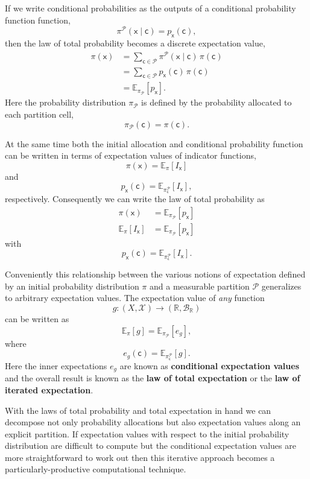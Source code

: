 \documentclass[
  letterpaper,
  DIV=11,
  numbers=noendperiod]{scrartcl}
\begin{document}
If we write conditional probabilities as the outputs of a conditional
probability function function, \[
\pi^{\mathcal{P}}( \mathsf{x} \mid \mathsf{c} )
=
p_{\mathsf{x}}( \mathsf{c} ),
\] then the law of total probability becomes a discrete expectation
value, \begin{align*}
\pi( \mathsf{x} )
&=
\sum_{ \mathsf{c} \in \mathcal{P} }
\pi^{\mathcal{P}}( \mathsf{x} \mid \mathsf{c} ) \, \pi( \mathsf{c} )
\\
&=
\sum_{ \mathsf{c} \in \mathcal{P} }
p_{\mathsf{x}}( \mathsf{c} ) \, \pi( \mathsf{c} )
\\
&=
\mathbb{E}_{ \pi_{\mathcal{P}} } [ p_{\mathsf{x}} ].
\end{align*} Here the probability distribution \(\pi_{\mathcal{P}}\) is
defined by the probability allocated to each partition cell, \[
\pi_{\mathcal{P}}( \mathsf{c} ) = \pi( \mathsf{c} ).
\]

At the same time both the initial allocation and conditional probability
function can be written in terms of expectation values of indicator
functions, \[
\pi( \mathsf{x} )
=
\mathbb{E}_{\pi}[ I_{\mathsf{x}} ]
\] and \[
p_{\mathsf{x}}(\mathsf{c})
=
\mathbb{E}_{\pi^{\mathcal{P}}_{\mathsf{c}} }[ I_{\mathsf{x}} ],
\] respectively. Consequently we can write the law of total probability
as \begin{align*}
\pi( \mathsf{x} )
&=
\mathbb{E}_{ \pi_{\mathcal{P}} } [ p_{\mathsf{x}} ]
\\
\mathbb{E}_{\pi}[ I_{\mathsf{x}} ]
&=
\mathbb{E}_{ \pi_{\mathcal{P}} } [ p_{\mathsf{x}} ]
\end{align*} with \[
p_{\mathsf{x}}(\mathsf{c})
=
\mathbb{E}_{\pi^{\mathcal{P}}_{\mathsf{c}} }[ I_{\mathsf{x}} ].
\]

Conveniently this relationship between the various notions of
expectation defined by an initial probability distribution \(\pi\) and a
measurable partition \(\mathcal{P}\) generalizes to arbitrary
expectation values. The expectation value of \emph{any} function \[
g : (X, \mathcal{X}) \rightarrow
    (\mathbb{R}, \mathcal{B}_{\mathbb{R}})
\] can be written as \[
\mathbb{E}_{\pi}[ g ]
=
\mathbb{E}_{ \pi_{\mathcal{P}} } [ e_{g} ],
\] where \[
e_{g}(\mathsf{c})
=
\mathbb{E}_{ \pi^{\mathcal{P}}_{\mathsf{c}} }[ g ].
\] Here the inner expectations \(e_{g}\) are known as
\textbf{conditional expectation values} and the overall result is known
as the \textbf{law of total expectation} or the \textbf{law of iterated
expectation}.

With the laws of total probability and total expectation in hand we can
decompose not only probability allocations but also expectation values
along an explicit partition. If expectation values with respect to the
initial probability distribution are difficult to compute but the
conditional expectation values are more straightforward to work out then
this iterative approach becomes a particularly-productive computational
technique.
\end{document}
